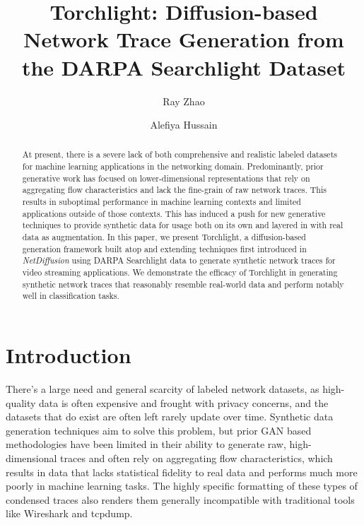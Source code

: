 \documentclass[acmsmall, nonacm]{acmart}
\begin{document}
\title{Torchlight: Diffusion-based Network Trace Generation from the DARPA Searchlight Dataset}

\author{Ray Zhao}

\author{Alefiya Hussain}

\renewcommand{\shortauthors}{Zhao, Hussain}

\begin{abstract}
  At present, there is a severe lack of both comprehensive and realistic labeled datasets
  for machine learning applications in the networking domain. Predominantly, prior generative
  work has focused on lower-dimensional representations that rely on aggregating flow 
  characteristics and lack the fine-grain of raw network traces. This results in suboptimal
  performance in machine learning contexts and limited applications outside of those 
  contexts. This has induced a push for new generative techniques to provide 
  synthetic data for usage both on its own and layered in with real data as augmentation.
  In this paper, we present Torchlight, a diffusion-based
  generation framework built atop and extending techniques first introduced in 
  \textit{NetDiffusion} \cite{Jiang2024} using DARPA Searchlight \cite{Ardi2022} data to generate synthetic network traces
  for video streaming applications. We demonstrate the efficacy of Torchlight in generating
  synthetic network traces that reasonably resemble real-world data and perform notably well
  in classification tasks. 
\end{abstract}

\maketitle

\section{Introduction}
There's a large need and general scarcity of labeled network datasets,
as high-quality data is often expensive and frought with privacy concerns,
and the datasets that do exist are often left rarely update over time.
Synthetic data generation techniques aim to solve this problem, but prior
GAN based methodologies have been limited in their ability to generate
raw, high-dimensional traces and often rely on aggregating flow characteristics,
which results in data that lacks statistical fidelity to real data and performs
much more poorly in machine learning tasks. The highly specific formatting of
these types of condensed traces also renders them generally incompatible with
traditional tools like Wireshark and tcpdump.
\end{document}
